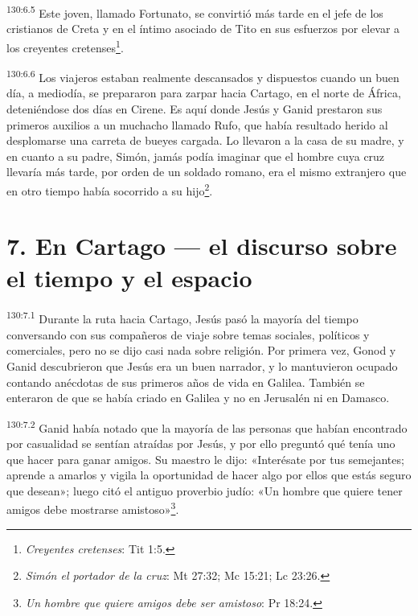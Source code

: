 \par 
\textsuperscript{130:6.5} Este joven, llamado Fortunato, se convirtió más tarde en el jefe de los cristianos de Creta y en el íntimo asociado de Tito en sus esfuerzos por elevar a los creyentes cretenses\footnote{\textit{Creyentes cretenses}: Tit 1:5.}.

\par 
\textsuperscript{130:6.6} Los viajeros estaban realmente descansados y dispuestos cuando un buen día, a mediodía, se prepararon para zarpar hacia Cartago, en el norte de África, deteniéndose dos días en Cirene. Es aquí donde Jesús y Ganid prestaron sus primeros auxilios a un muchacho llamado Rufo, que había resultado herido al desplomarse una carreta de bueyes cargada. Lo llevaron a la casa de su madre, y en cuanto a su padre, Simón, jamás podía imaginar que el hombre cuya cruz llevaría más tarde, por orden de un soldado romano, era el mismo extranjero que en otro tiempo había socorrido a su hijo\footnote{\textit{Simón el portador de la cruz}: Mt 27:32; Mc 15:21; Lc 23:26.}.

\section*{7. En Cartago --- el discurso sobre el tiempo y el espacio}
\par 
\textsuperscript{130:7.1} Durante la ruta hacia Cartago, Jesús pasó la mayoría del tiempo conversando con sus compañeros de viaje sobre temas sociales, políticos y comerciales, pero no se dijo casi nada sobre religión. Por primera vez, Gonod y Ganid descubrieron que Jesús era un buen narrador, y lo mantuvieron ocupado contando anécdotas de sus primeros años de vida en Galilea. También se enteraron de que se había criado en Galilea y no en Jerusalén ni en Damasco.

\par 
\textsuperscript{130:7.2} Ganid había notado que la mayoría de las personas que habían encontrado por casualidad se sentían atraídas por Jesús, y por ello preguntó qué tenía uno que hacer para ganar amigos. Su maestro le dijo: «Interésate por tus semejantes; aprende a amarlos y vigila la oportunidad de hacer algo por ellos que estás seguro que desean»; luego citó el antiguo proverbio judío: «Un hombre que quiere tener amigos debe mostrarse amistoso»\footnote{\textit{Un hombre que quiere amigos debe ser amistoso}: Pr 18:24.}.

